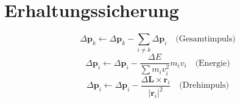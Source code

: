 \section{Erhaltungssicherung}
\[
\Delta\mathbf{p}_k \leftarrow \Delta\mathbf{p}_k - \sum_{i\neq k} \Delta\mathbf{p}_i \quad \text{(Gesamtimpuls)}
\]
\[
\Delta\mathbf{p}_i \leftarrow \Delta\mathbf{p}_i - \frac{\Delta E}{\sum m_i v_i^2} m_i v_i \quad \text{(Energie)}
\]
\[
\Delta\mathbf{p}_i \leftarrow \Delta\mathbf{p}_i - \frac{\Delta\mathbf{L} \times \mathbf{r}_i}{|\mathbf{r}_i|^2} \quad \text{(Drehimpuls)}
\]